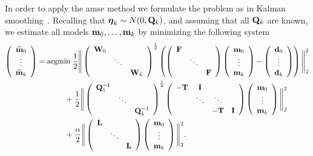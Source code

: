 \documentclass[leqno,onefignum,onetabnum]{siamltexmm}
\newcommand{\bfF}	{{\bf{F}}}
\newcommand{\bfI}	{{\bf{I}}}
\newcommand{\bfL}	{{\bf{L}}}
\newcommand{\bfQ}	{{\bf{Q}}}
\newcommand{\bfT}	{{\bf{T}}}
\newcommand{\bfW}	{{\bf{W}}}
\newcommand{\bfd}	{{\bf{d}}}
\newcommand{\bfm}	{{\bf{m}}}
\newcommand{\hf}        {{\frac 12}}
\newcommand{\bfeta}     {{\boldsymbol \eta}}
\renewcommand{\hf}		 {\frac12}
\newcommand{\bfmhat}    {{\widehat{\bfm}}}
\begin{document}
In order to apply the amse method we formulate the problem as in Kalman smoothing~\cite{kalman1960,Aravkin2013}. Recalling that  $\bfeta_k \sim N(0,\bfQ_k)$, and assuming that all $\bfQ_k$ are known, we estimate all models $\bfm_0, \hdots, \bfm_k$ by minimizing the following system 
\begin{align}
\left(\begin{array}{c}  \bfmhat_0  \\ \vdots \\ \bfmhat_k\end{array}\right)
={\rm argmin }\;
& \hf \Bigg\|
\left(\begin{array}{ccc}\bfW_0 & &  \\ & \ddots &  \\  &  & \bfW_k \end{array}\right)^{\hf}	
\left(
\left(\begin{array}{ccc}\bfF & &  \\    & \ddots & \\ & & \bfF \end{array}\right)	
\left(\begin{array}{c}  \bfm_0  \\ \vdots \\ \bfm_k\end{array}\right) -
\left(\begin{array}{c} \bfd_0   \\ \vdots \\ \bfd_k\end{array}\right)
\right)\Bigg\|^2_2\\
\nonumber
 + 
& \;\hf \Bigg\|
\left(\begin{array}{ccc}\bfQ^{-1}_1 &  \\ & \ddots  \\ & &\bfQ^{-1}_k \end{array}\right)^{\hf}
\left( \begin{array}{cccc} -\bfT & \bfI &   \\  & \ddots & \ddots\\ & &   -\bfT & \bfI  \end{array}\right)
\left(\begin{array}{c}  \bfm_0  \\ \vdots \\ \bfm_k \end{array}\right)\Bigg\|^2_2\\
\nonumber
 + & \;{\frac \alpha 2}\Bigg\|
\left(\begin{array}{ccc}\bfL &  \\ & \ddots  \\ & &\bfL\end{array}\right)
\left(\begin{array}{c}  \bfm_0  \\ \vdots \\ \bfm_k \end{array}\right)\Bigg\|^2_2. 
\end{align}
\end{document}
